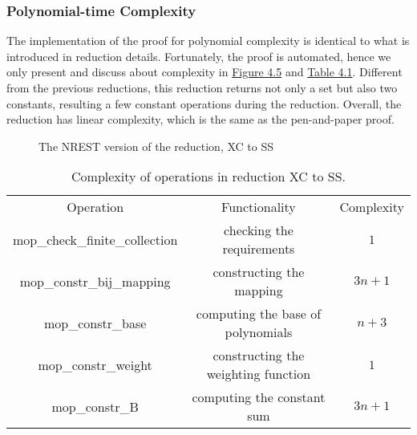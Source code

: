 \subsubsection{Polynomial-time Complexity}
The implementation of the proof for polynomial complexity is identical to what is introduced in reduction details. 
Fortunately, the proof is automated, hence we only present and discuss about complexity in \hyperref[fig:4.5]{Figure 4.5} and \hyperref[table:4.1]{Table 4.1}.
Different from the previous reductions, this reduction returns not only a set but also two constants,
resulting a few constant operations during the reduction. Overall, the reduction has linear complexity,
which is the same as the pen-and-paper proof.
\begin{figure}[!h]
    \caption{The NREST version of the reduction, XC to SS}
    \label{fig:4.5}
\end{figure}
\begin{table}[!h]
    \centering
    \begin{tabular}{| c | c | c |}
        \hline 
        Operation & Functionality & Complexity \\ 
        \hhline{|=|=|=|}
        mop\_check\_finite\_collection & checking the requirements & $1$ \\ 
        \hline
        mop\_constr\_bij\_mapping & constructing the mapping & $3n + 1$ \\ 
        \hline
        mop\_constr\_base & computing the base of polynomials & $n + 3$ \\ 
        \hline
        mop\_constr\_weight & constructing the weighting function & $1$\\ 
        \hline
        mop\_constr\_B & computing the constant sum & $3n + 1$ \\
        \hline
    \end{tabular}
    \caption{Complexity of operations in reduction XC to SS.}
    \label{table:4.1}
\end{table}

